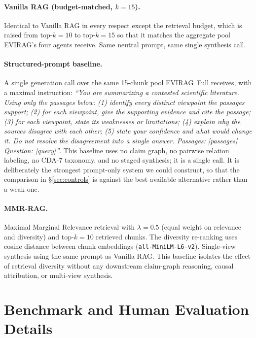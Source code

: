 \documentclass[11pt]{article}
\newcommand{\system}{\textsc{EVIRAG}\xspace}
\begin{document}
\paragraph{Vanilla RAG (budget-matched, $k{=}15$).}
Identical to Vanilla RAG in every respect except the retrieval budget, which is
raised from top-$k{=}10$ to top-$k{=}15$ so that it matches the aggregate pool
\system's four agents receive.  Same neutral prompt, same single synthesis
call.

\paragraph{Structured-prompt baseline.}
A single generation call over the same 15-chunk pool \system\ Full receives,
with a maximal instruction:
\textit{``You are summarizing a contested scientific literature. Using only the
passages below: (1) identify every distinct viewpoint the passages support;
(2) for each viewpoint, give the supporting evidence and cite the passage;
(3) for each viewpoint, state its weaknesses or limitations; (4) explain why
the sources disagree with each other; (5) state your confidence and what would
change it. Do not resolve the disagreement into a single answer.
Passages: [passages] Question: [query]''}.
This baseline uses no claim graph, no pairwise relation labeling, no CDA-7
taxonomy, and no staged synthesis; it is a single call.  It is deliberately the
strongest prompt-only system we could construct, so that the comparison in
\S\ref{sec:controls} is against the best available alternative rather than a
weak one.

\paragraph{MMR-RAG.}
Maximal Marginal Relevance retrieval \citep{carbonell1998mmr} with
$\lambda{=}0.5$ (equal weight on relevance and diversity) and
top-$k{=}10$ retrieved chunks.  The diversity re-ranking uses cosine
distance between chunk embeddings (\texttt{all-MiniLM-L6-v2}).
Single-view synthesis using the same prompt as Vanilla RAG.
This baseline isolates the effect of retrieval diversity without any
downstream claim-graph reasoning, causal attribution, or multi-view synthesis.


\section{Benchmark and Human Evaluation Details}
\label{app:protocol}
\end{document}
